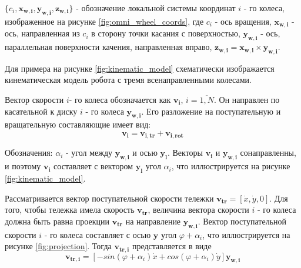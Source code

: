 \documentclass[oneside,final,14pt]{extreport}
\newcommand{\bs}{\boldsymbol}
\begin{document}
$\{c_{i},\bs{x_{w,i}},\bs{y_{w,i}},\bs{z_{w,i}}\}$ - обозначение локальной системы координат $i$ - го колеса, изображенное на рисунке \ref{fig:omni_wheel_coords}, где $c_{i}$ - ось вращения, $\bs{x_{w,i}}$  - ось, направленная из $c_{i}$  в сторону точки касания с поверхностью, $\bs{y_{w,i}}$ - ось, параллельная поверхности качения, направленная вправо, $\bs{z_{w,i}} = \bs{x_{w,i}} \times \bs{y_{w,i}}$.  

Для примера на рисунке \ref{fig:kinematic_model} схематически изображается кинематическая модель робота с тремя всенаправленными колесами.


\begin{figure}[H]
\end{figure}

\begin{figure}[H]
\end{figure}

Вектор скорости $i$- го колеса обозначается как  $\bs{v_{i}}$, $i = \overline{1,N}$. Он направлен по касательной к диску $i$ - го колеса $\bs{y_{w,i}}$. Его разложение на поступательную и  вращательную составляющие имеет вид:
\begin{equation}
\bs{v_{i}}
=
\bs{v_{i,tr}}
+
\bs{v_{i,rot}}
\end{equation}

Обозначения: $\alpha_{i}$ - угол между $\bs{y_{w,i}}$ и осью $\bs{y_{l}}$. Векторы $\bs{v_{i}}$ и $\bs{y_{w,i}}$ сонаправленны, и поэтому $\bs{v_{i}}$ составляет с вектором  $\bs{y_{l}}$ угол $\alpha_{i}$, что иллюстрируется на рисунке \ref{fig:kinematic_model}.



Рассматривается вектор поступательной скорости тележки $\bs{v_{tr}}=[\dot{x},\dot{y},0]$. Для того, чтобы тележка имела скорость $\bs{v_{tr}}$, величина вектора скорости $i$ - го колеса должна быть равна проекции $\bs{v_{tr}}$ на направление $\bs{y_{w,i}}$. Вектор поступательной скорости $i$ - го колеса составляет с осью $\bs{y}$  угол $\varphi + \alpha_{i}$, что иллюстрируется на рисунке \ref{fig:projection}. Тогда $\bs{v_{tr,i}}$ представляется в виде
\begin{equation}
\label{eq:v_rt_i_global}
\bs{v_{tr,i}} 
=
[
-sin(\varphi +\alpha_{i})
\dot{x}
+
cos(\varphi +\alpha_{i})
\dot{y}
]
\bs{y_{w,i}}
\end{equation} 
\end{document}
